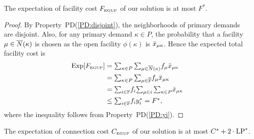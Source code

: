 \documentclass[11pt]{article}
\begin{document}

\begin{lemma}\label{lemma:3fac}
The expectation of facility cost $F_{\mbox{\tiny\rm EGUP}}$ of our solution is
  at most $F^\ast$.
\end{lemma}

\begin{proof}
  By Property~PD(\ref{PD:disjoint}), the neighborhoods of
  primary demands are disjoint. Also, for any primary demand
  $\kappa\in P$, the probability that a facility
  $\mu\in{\overline{N}}(\kappa)$ is chosen as the open facility
  $\phi(\kappa)$ is ${\bar x}_{\mu\kappa}$. Hence the expected
  total facility cost is
%
\begin{align*}
    \mbox{\rm Exp}[F_{\mbox{\tiny\rm EGUP}}]
	&= \textstyle{\sum_{\kappa\in P}\sum_{\mu\in{\overline{N}}(\kappa)}} f_{\mu} {\bar x}_{\mu\kappa}
	\\
	&= \textstyle{\sum_{\kappa\in P}\sum_{\mu\in\overline{\mathbb{F}}}} f_{\mu} {\bar x}_{\mu\kappa} 
	\\
	&= \textstyle{\sum_{i\in\mathbb{F}}} f_i \textstyle{\sum_{\mu\in i}\sum_{\kappa\in P}} {\bar x}_{\mu\kappa} 
	\\
	&\leq \textstyle{\sum_{i\in\mathbb{F}}} f_i y_i^\ast 
	= F^\ast,
\end{align*}
%
where the inequality follows from Property~PD(\ref{PD:yi}).
\end{proof}


\begin{lemma}\label{lemma:3dist}
The expectation of connection cost $C_{\mbox{\tiny\rm EGUP}}$ of our solution
is at most  $C^\ast+2\cdot\mbox{\rm LP}^\ast$.
\end{lemma}
\end{document}

